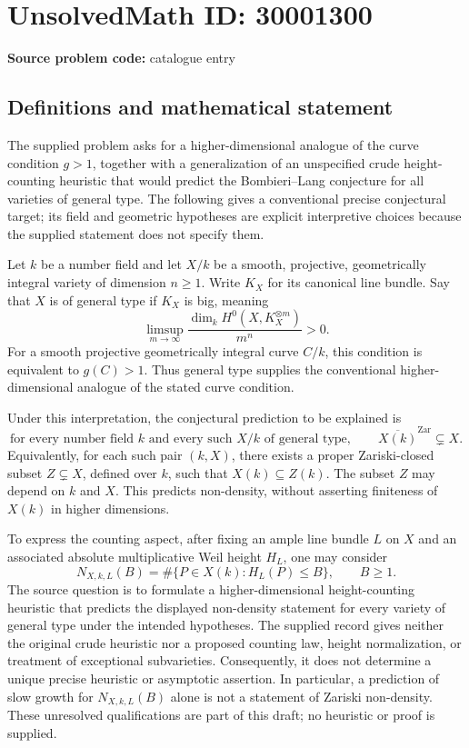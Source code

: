 \documentclass[11pt]{article}
\begin{document}
\section*{UnsolvedMath ID: 30001300}
\textbf{Source problem code:} catalogue entry
\subsection{Definitions and mathematical statement}
The supplied problem asks for a higher-dimensional analogue of the curve condition \(g>1\), together with a generalization of an unspecified crude height-counting heuristic that would predict the Bombieri--Lang conjecture for all varieties of general type. The following gives a conventional precise conjectural target; its field and geometric hypotheses are explicit interpretive choices because the supplied statement does not specify them.

Let \(k\) be a number field and let \(X/k\) be a smooth, projective, geometrically integral variety of dimension \(n\geq 1\). Write \(K_X\) for its canonical line bundle. Say that \(X\) is of general type if \(K_X\) is big, meaning
\[
\limsup_{m\to\infty}\frac{\dim_k H^0(X,K_X^{\otimes m})}{m^n}>0.
\]
For a smooth projective geometrically integral curve \(C/k\), this condition is equivalent to \(g(C)>1\). Thus general type supplies the conventional higher-dimensional analogue of the stated curve condition.

Under this interpretation, the conjectural prediction to be explained is
\[
\text{for every number field }k\text{ and every such }X/k\text{ of general type},\qquad
\overline{X(k)}^{\mathrm{Zar}}\subsetneq X.
\]
Equivalently, for each such pair \((k,X)\), there exists a proper Zariski-closed subset \(Z\subsetneq X\), defined over \(k\), such that \(X(k)\subseteq Z(k)\). The subset \(Z\) may depend on \(k\) and \(X\). This predicts non-density, without asserting finiteness of \(X(k)\) in higher dimensions.

To express the counting aspect, after fixing an ample line bundle \(L\) on \(X\) and an associated absolute multiplicative Weil height \(H_L\), one may consider
\[
N_{X,k,L}(B)=\#\{P\in X(k):H_L(P)\leq B\},\qquad B\geq 1.
\]
The source question is to formulate a higher-dimensional height-counting heuristic that predicts the displayed non-density statement for every variety of general type under the intended hypotheses. The supplied record gives neither the original crude heuristic nor a proposed counting law, height normalization, or treatment of exceptional subvarieties. Consequently, it does not determine a unique precise heuristic or asymptotic assertion. In particular, a prediction of slow growth for \(N_{X,k,L}(B)\) alone is not a statement of Zariski non-density. These unresolved qualifications are part of this draft; no heuristic or proof is supplied.
\end{document}
